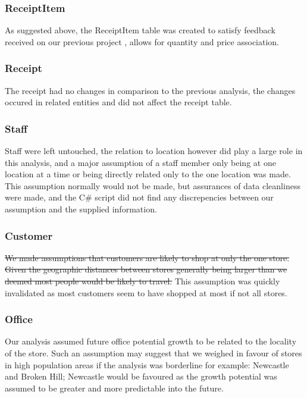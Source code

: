 \documentclass{article}
\begin{document}
            \subsubsection{ReceiptItem}
                As suggested above, the ReceiptItem table was created
                to satisfy feedback received on our previous project
                , allows for quantity and price association.

            \subsubsection{Receipt}
                The receipt had no changes in comparison to the previous
                analysis, the changes occured in related entities 
                and did not affect the receipt table.

            \subsubsection{Staff}
                Staff were left untouched, the relation to location 
                however did play a large role in this analysis, and 
                a major assumption of a staff member only being at one 
                location at a time or being directly related only to
                the one location was made.
                \\
                This assumption normally would not be made, but 
                assurances of data cleanliness were made, and the C\#
                script did not find any discrepencies between our assumption and the supplied information.

            \subsubsection{Customer}
            \sout{We made assumptions that customers are likely to shop at only the one store. Given the geographic distances
                between stores generally being larger than we deemed 
                most people would be likely to travel.}
                This assumption was quickly invalidated as most customers 
                seem to have shopped at most if not all stores.

            \subsubsection{Office}
                Our analysis assumed future office potential growth to be 
                related to the locality of the store. Such an assumption
                may suggest that we weighed in favour of stores in 
                high population areas if the analysis was borderline
                for example: Newcastle and Broken Hill; Newcastle
                would be favoured as the growth potential was assumed to 
                be greater and more predictable into the future.
\end{document}
